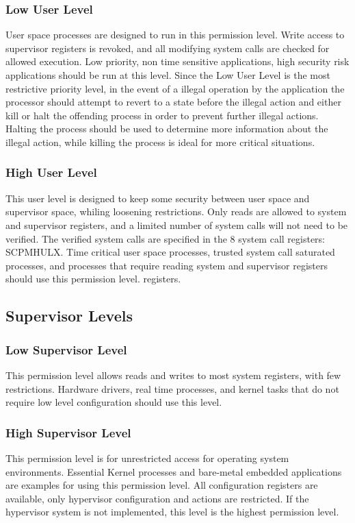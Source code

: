 \documentclass[letterpaper, 11pt]{article}
\begin{document}
\subsubsection{Low User Level} User space processes are designed to run in this permission level. Write access to supervisor registers is revoked,
and all modifying system calls are checked for allowed execution. Low priority, non time sensitive applications, high security risk applications
should be run at this level. Since the Low User Level is the most restrictive priority level, in the event of a illegal operation by the application
the processor should attempt to revert to a state before the illegal action and either kill or halt the offending process in order to prevent further
illegal actions. Halting the process should be used to determine more information about the illegal action, while killing the process is ideal for
more critical situations. 

\subsubsection{High User Level} This user level is designed to keep some security between user space and supervisor space, whiling loosening
restrictions. Only reads are allowed to system and supervisor registers, and a limited number of system calls will not need to be verified. 
The verified system calls are specified in the 8 system call registers: SCPMHULX. Time critical user space processes, trusted system call 
saturated processes, and processes that require reading system and supervisor registers should use this permission level. 
registers. 

\subsection{Supervisor Levels}
\subsubsection{Low Supervisor Level} This permission level allows reads and writes to most system registers, with few restrictions. Hardware drivers,
real time processes, and kernel tasks that do not require low level configuration should use this level.
\subsubsection{High Supervisor Level} This permission level is for unrestricted access for operating system environments. Essential Kernel processes and
bare-metal embedded applications are examples for using this permission level. All configuration registers are available, only hypervisor configuration and
actions are restricted. If the hypervisor system is not implemented, this level is the highest permission level.
\end{document}
